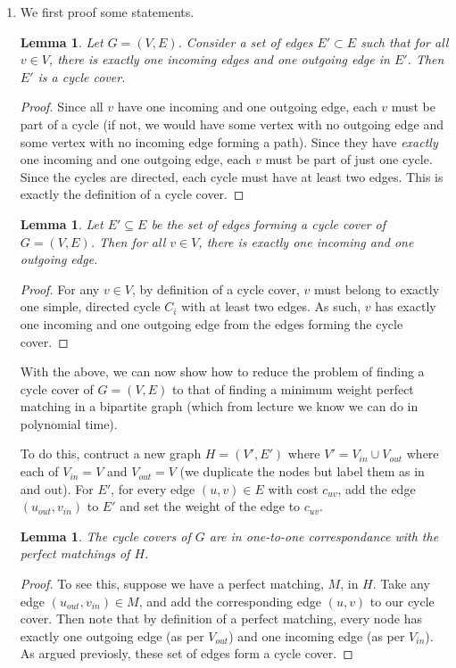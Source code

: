 \documentclass[12pt]{exam}
\newtheorem{lemma}[theorem]{Lemma}
\newcommand{\Q}[1]{\question{\large{\textbf{#1}}}}
\begin{document}
\begin{questions}
\newpage
\Q{Problem 24}
\begin{solution}
  \begin{enumerate}[label=(\alph*)]
    \item We first proof some statements.
    \begin{lemma}
      Let $G = (V, E)$. Consider a set of edges $E' \subset E$ such that for all $v \in V$, there is exactly one incoming edges and one outgoing edge in $E'$. Then $E'$ is a cycle cover.
    \end{lemma}
    \begin{proof}
      Since all $v$ have one incoming and one outgoing edge, each $v$ must be part of a cycle (if not, we would have some vertex with no outgoing edge and some vertex with no incoming edge forming a path). Since they have \textit{exactly} one incoming and one outgoing edge, each $v$ must be part of just one cycle. Since the cycles are directed, each cycle must have at least two edges. This is exactly the definition of a cycle cover.
    \end{proof}
    \begin{lemma}
      Let $E' \subseteq E$ be the set of edges forming a cycle cover of $G = (V,E)$. Then for all $v \in V$, there is exactly one incoming and one outgoing edge.
    \end{lemma}
    \begin{proof}
      For any $v \in V$, by definition of a cycle cover, $v$ must belong to exactly one simple, directed cycle $C_i$ with at least two edges. As such, $v$ has exactly one incoming and one outgoing edge from the edges forming the cycle cover.
    \end{proof}

    With the above, we can now show how to reduce the problem of finding a cycle cover of $G = (V,E)$ to that of finding a minimum weight perfect matching in a bipartite graph (which from lecture we know we can do in polynomial time).

    To do this, contruct a new graph $H = (V', E')$ where $V' = V_{in} \cup V_{out}$ where each of $V_{in} = V$ and $V_{out} = V$ (we duplicate the nodes but label them as in and out). For $E'$, for every edge $(u, v) \in E$ with cost $c_{uv}$, add the edge $(u_{out}, v_{in})$ to $E'$ and set the weight of the edge to $c_{uv}$.

    \begin{lemma}
      The cycle covers of $G$ are in one-to-one correspondance with the perfect matchings of $H$.
    \end{lemma}
    \begin{proof}
      To see this, suppose we have a perfect matching, $M$, in $H$. Take any edge $(u_{out}, v_{in}) \in M$, and add the corresponding edge $(u,v)$ to our cycle cover. Then note that by definition of a perfect matching, every node has exactly one outgoing edge (as per $V_{out}$) and one incoming edge (as per $V_{in}$). As argued previosly, these set of edges form a cycle cover.



\end{proof}
\end{enumerate}
\end{solution}
\end{questions}
\end{document}
